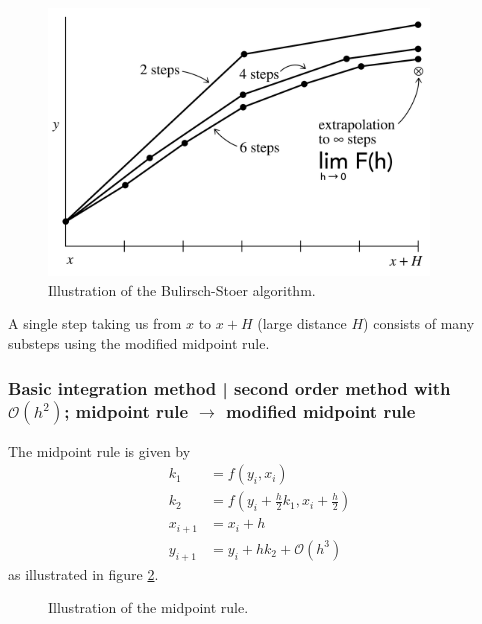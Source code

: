 \begin{figure}[!htb]
  \centering
  \includegraphics[width=0.9\textwidth]{figures/bulirsch.pdf}\hfill
  \caption{Illustration of the Bulirsch-Stoer algorithm.}
  \label{fig:bulirsch_stoer}
\end{figure}


A single step taking us from $x$ to $x+H$ (large distance $H$) consists of many substeps using the modified midpoint rule.

\subsubsection{Basic integration method | second order method with $\mathcal{O}(h^2)$; midpoint rule $\rightarrow$ modified midpoint rule}
The midpoint rule is given by
\begin{equation}
  \begin{aligned}
    k_1 &= f(y_i,x_i) \\
    k_2 &= f\left( y_i + \frac{h}{2} k_1, x_i + \frac{h}{2} \right) \\
    x_{i+1} &= x_i + h \\
    y_{i+1} &= y_i + h k_2 + \mathcal{O}(h^3)
  \end{aligned}
\end{equation}
as illustrated in figure \ref{fig:midpoint_rule}.

\begin{figure}[!htb]
  \centering
  \hfill
  \caption{Illustration of the midpoint rule.}
  \label{fig:midpoint_rule}
\end{figure}

